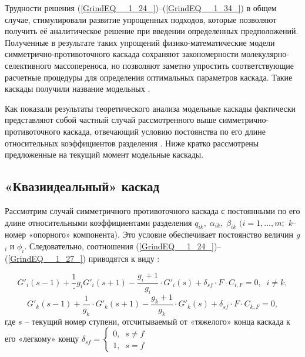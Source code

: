 Трудности решения (\ref{GrindEQ__1_24_})--(\ref{GrindEQ__1_34_}) в общем случае, стимулировали развитие упрощенных подходов, которые позволяют получить её аналитическое решение при введении определенных предположений. Полученные в результате таких упрощений физико-математические модели симметрично-противоточного каскада сохраняют закономерности молекулярно-селективного массопереноса, но позволяют заметно упростить соответствующие расчетные процедуры для определения оптимальных параметров каскада. Такие каскады получили название модельных \cite{minenkoTeoriiKaskadovDlya1965, delagarzaMulticomponentIsotopeSeparation1961, zhigalovskiyLekcionnyeMaterialyPo1999, kolokoltsovDesignCascadesSeparating1970, kolokolcovVoprosuPostroeniiKaskadov1970, minenkoPredelnoeObogashcheniePromezhutochnyh1972, yamamotoMulticomponentIsotopeSeparating1978, wuStudyMulticomponentIsotope, borisevichRascheteKaskadovDopolnitelnym1993, woodCriterionEffiencyMultiisotope1999, sulaberidzeOsobennostiObogashcheniyaKomponentov2006, sazykinKvaziidealnyeKaskadyDlya2000, sulaberidzeSravnenieOptimalnyhModelnyh2008}.

Как показали результаты теоретического анализа модельные каскады фактически представляют собой частный случай рассмотренного выше симметрично-противоточного каскада, отвечающий условию постоянства по его длине относительных коэффициентов разделения \cite{sulaberidzeClassificationModelCascades2020}.  
Ниже кратко рассмотрены предложенные на текущий момент модельные каскады.

\subsection{«Квазиидеальный» каскад}

Рассмотрим случай симметричного противоточного каскада с постоянными по его длине относительными коэффициентами разделения $q_{ik} ,\; \alpha _{ik} ,\; \beta _{ik} $ $(i=1,...,m;$ \textit{k}--номер «опорного» компонента). Это условие обеспечивает постоянство величин \textit{g${}_{i}$} и $\phi _{i} $. Следовательно, соотношения (\ref{GrindEQ__1_24_})--(\ref{GrindEQ__1_27_}) приводятся к виду \cite{sulaberidzeTeoriyaKaskadovDlya2011}:

\begin{equation} \label{GrindEQ__1_52_} 
  G'_{i} (s-1)+\frac{1} \cdot {g_{i} } G'_{i} (s+1)-\frac{g_{i} +1}{g_{i} }\cdot G'_{i} (s)+\delta _{sf} \cdot F \cdot C_{i,F} =0,\; \; i\ne k, 
  \end{equation} 
  \begin{equation} \label{GrindEQ__1_53_} 
  G'_{k} (s-1)+\frac{1}{g_{k} } \cdot G'_{k} (s+1)-\frac{g_{k} +1}{g_{k} }\cdot G'_{k} (s)+\delta _{sf} \cdot F \cdot C_{k,F} =0, 
\end{equation}
где $s$ – текущий номер ступени, отсчитываемый от «тяжелого» конца каскада к его «легкому» концу $\delta _{sf} =\left\{\begin{array}{l} {0,\; \; s\ne f} \\ {1,\; \; s=f} \end{array}\right.$

